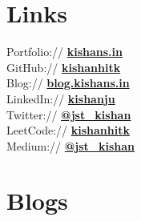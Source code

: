 \documentclass[]{deedy-resume-openfont}
\begin{document}
\begin{minipage}[t]{0.28\textwidth}

\section{Links} 

Portfolio:// \href{https://kishans.in}{\bf kishans.in} \\
GitHub:// \href{https://github.com/kishanhitk}{\bf kishanhitk} \\
Blog:// \href{https://blog.kishans.in}{\bf blog.kishans.in} \\
LinkedIn://  \href{https://www.linkedin.com/in/kishanju}{\bf kishanju} \\
Twitter://  \href{https://twitter.com/jst_kishan}{\bf @jst\_kishan} \\
LeetCode:// \href{https://leetcode.com/kishanhitk/}{\bf kishanhitk} \\
Medium:// \href{https://medium.com/@jst_kishan}{\bf @jst\_kishan} \\








\section{Blogs}


\end{minipage}
\end{document}
